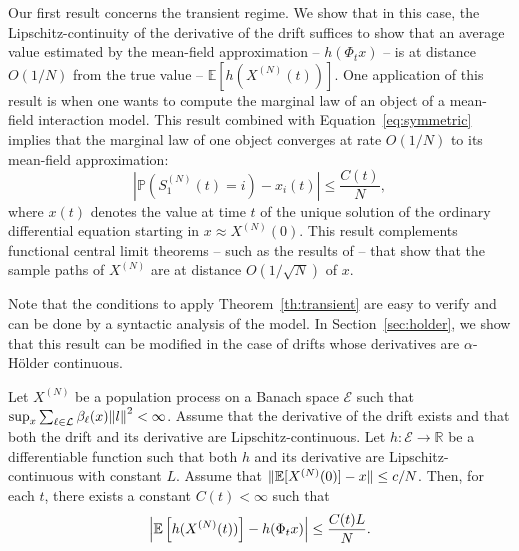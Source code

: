 \documentclass[sigconf]{acmart}
\newcommand\SN{S^{(N)}}
\newcommand\XN{X^{(N)}}
\newcommand\E{\mathcal{E}}
\newcommand\R{\mathbb{R}}
\newcommand\calL{\mathcal{L}}
\newcommand\esp[1]{{\mathchoice{\besp{#1}}{\sesp{#1}}{\sesp{#1}}{\sesp{#1}}}}
\newcommand\besp[1]{\mathbb{E}\left[#1\right]}
\newcommand\sesp[1]{\mathbb{E}[#1]}
\newcommand\norm[1]{{\mathchoice{\bnorm{#1}}{\snorm{#1}}{\snorm{#1}}{\snorm{#1}}}}
\newcommand\bnorm[1]{\left\|#1\right\|}
\newcommand\snorm[1]{\|#1\|}
\newcommand\abs[1]{\left|#1\right|}
\newcommand\proba[1]{\mathbb{P}\left(#1\right)}
\begin{document}
Our first result concerns the transient regime. We show that in this
case, the Lipschitz-continuity of the derivative of the drift suffices
to show that an average value estimated by the mean-field
approximation -- $h(\Phi_tx)$ -- is at distance $O(1/N)$ from the true
value -- $\sesp{h(\XN(t))}$.  One application of this result is when
one wants to compute the marginal law of an object of a mean-field
interaction model.  This result combined with
Equation~\eqref{eq:symmetric} implies that the marginal law of one
object converges at rate $O(1/N)$ to its mean-field approximation:
\begin{equation*}
  \abs{\proba{\SN_1(t)=i} - x_i(t)} \le \frac{C(t)}{N},
\end{equation*}
where $x(t)$ denotes the value at time $t$ of the unique solution of
the ordinary differential equation starting in $x\approx\XN(0)$. This
result complements functional central limit theorems -- such as the
results of \cite{kurtz1978strong} -- that show that the sample paths
of $\XN$ are at distance $O(1/\sqrt{N})$ of $x$. %

Note that the conditions to apply Theorem~\ref{th:transient} are easy
to verify and can be done by a syntactic analysis of the model.  In
Section~\ref{sec:holder}, we show that this result can be modified in
the case of drifts whose derivatives are $\alpha$-Hölder continuous.



\begin{theorem}
  \label{th:transient}
  Let $\XN$ be a population process on a Banach space $\E$ such that
  $\sup_x\sum_{\ell\in\calL}\beta_\ell(x)\norm{l}^2<\infty$. Assume
  that the derivative of the drift exists and that both the drift and
  its derivative are Lipschitz-continuous.  Let $h:\E\to\R$ be a
  differentiable function such that both $h$ and its derivative are
  Lipschitz-continuous with constant $L$. Assume that
  $\snorm{\esp{\XN(0)}-x}\le c/N$. Then, for each $t$, there
  exists a constant $C(t)<\infty$ such that
  \begin{align}
    \label{eq:th_transient}
    \abs{\esp{h(\XN(t))} - h(\Phi_tx)} \le \frac{C(t)L}{N}.
  \end{align}
\end{theorem}
\end{document}
